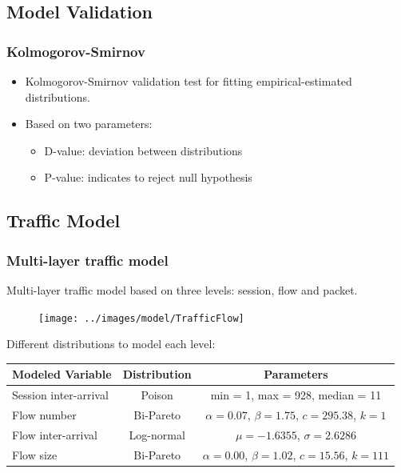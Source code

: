 \documentclass[9pt,handout,serif]{beamer}
\begin{document}
\subsection{Model Validation}
\begin{frame}[c]
	\frametitle{Kolmogorov-Smirnov}
	\begin{itemize}
		\item Kolmogorov-Smirnov validation test for fitting empirical-estimated distributions.
		\item Based on two parameters:
		\begin{itemize}
			\item D-value: deviation between distributions
			\item P-value: indicates to reject null hypothesis
		\end{itemize}
	\end{itemize}
\end{frame}

\subsection{Traffic Model}
\begin{frame}[c]
	\frametitle{Multi-layer traffic model}
	Multi-layer traffic model based on three levels: session, flow and packet.
	\begin{figure}
		\texttt{[image: ../images/model/TrafficFlow]}
	\end{figure}
	Different distributions to model each level:
	\begin{table}
	\begin{center}
		\begin{tabular}{ l | c | c }
			Modeled Variable & Distribution & Parameters \\ \hline
			Session inter-arrival & Poison & min = 1, max = 928, median = 11\\
			Flow number & Bi-Pareto & $\alpha = 0.07$, $\beta = 1.75$, $c = 295.38$, $k = 1$\\
			Flow inter-arrival & Log-normal & $\mu = -1.6355$, $\sigma = 2.6286$\\
			Flow size & Bi-Pareto & $\alpha = 0.00$, $\beta = 1.02$, $c = 15.56$, $k = 111$\\
		\end{tabular}
	\end{center}
\end{table}
\end{frame}

\end{document}
